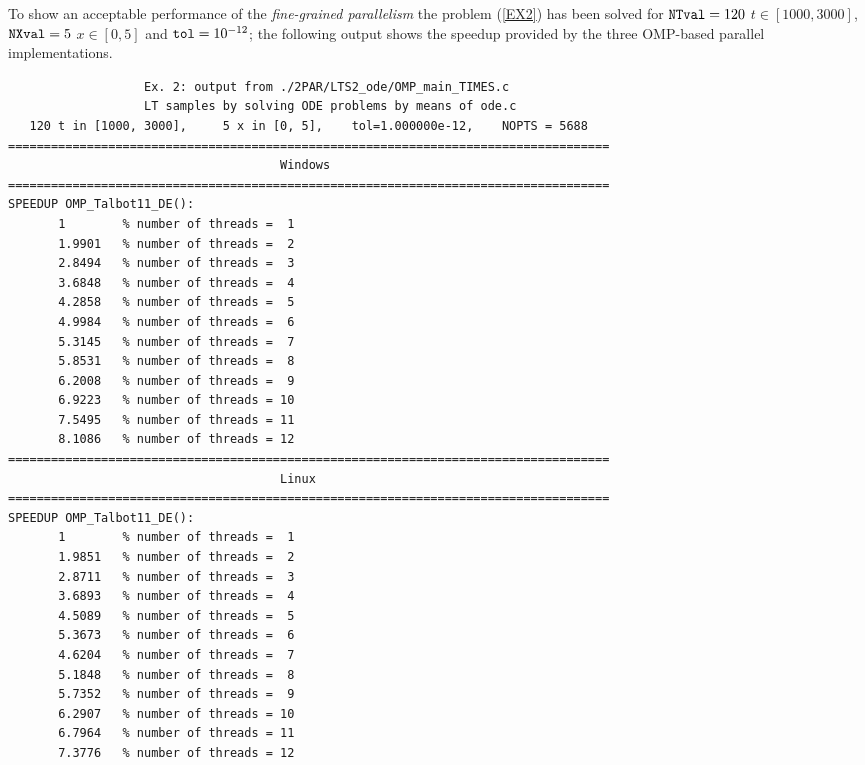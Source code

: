 \documentclass[a4paper,10pt]{report}%
\begin{document}
To show an acceptable performance of the {\em fine-grained parallelism} the problem (\ref{EX2}) has been solved for
${\tt NTval}=120$ $t\in[1000,3000]$, ${\tt NXval}=5$ $x\in[0,5]$ and ${\tt tol}=10^{-12}$; the following output shows
the speedup provided by the three OMP-based parallel implementations.
\begin{lstlisting}
                   Ex. 2: output from ./2PAR/LTS2_ode/OMP_main_TIMES.c
                   LT samples by solving ODE problems by means of ode.c
   120 t in [1000, 3000],     5 x in [0, 5],    tol=1.000000e-12,    NOPTS = 5688
====================================================================================
                                      Windows
====================================================================================
SPEEDUP OMP_Talbot11_DE():
       1        % number of threads =  1
       1.9901   % number of threads =  2
       2.8494   % number of threads =  3
       3.6848   % number of threads =  4
       4.2858   % number of threads =  5
       4.9984   % number of threads =  6
       5.3145   % number of threads =  7
       5.8531   % number of threads =  8
       6.2008   % number of threads =  9
       6.9223   % number of threads = 10
       7.5495   % number of threads = 11
       8.1086   % number of threads = 12
====================================================================================
                                      Linux
====================================================================================
SPEEDUP OMP_Talbot11_DE():
       1        % number of threads =  1
       1.9851   % number of threads =  2
       2.8711   % number of threads =  3
       3.6893   % number of threads =  4
       4.5089   % number of threads =  5
       5.3673   % number of threads =  6
       4.6204   % number of threads =  7
       5.1848   % number of threads =  8
       5.7352   % number of threads =  9
       6.2907   % number of threads = 10
       6.7964   % number of threads = 11
       7.3776   % number of threads = 12


\end{lstlisting}
\end{document}

